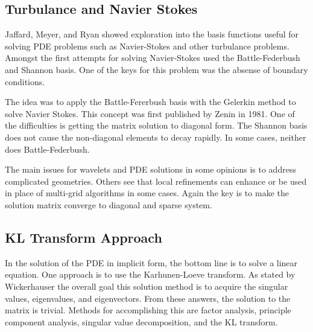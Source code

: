 \documentclass[11pt]{article}
\begin{document}


\subsection {Turbulance and Navier Stokes}
Jaffard, Meyer, and Ryan showed exploration into the basis functions useful for solving PDE problems such as Navier-Stokes and other turbulance problems.  Amongst the first attempts for solving Navier-Stokes used the Battle-Federbush and Shannon basis.  One of the keys for this problem was the absense of boundary conditions.  

The idea was to apply the Battle-Fererbush basis with the Gelerkin method to solve Navier Stokes.  This concept was first published by Zenin in 1981.  One of the difficulties is getting the matrix solution to diagonal form.  The Shannon basis does not cause the non-diagonal elements to decay rapidly.  In some cases, neither does Battle-Federbush.  

The main issues for wavelets and PDE solutions in some opinions is to address complicated geometries.  Others see that local refinements can enhance or be used in place of multi-grid algorithms in some cases.   Again the key is to make the solution matrix converge to diagonal and sparse system.  


\subsection {KL Transform Approach}
In the solution of the PDE in implicit form, the bottom line is to solve a linear equation.  One approach is to use the Karhunen-Loeve transform.   As stated by Wickerhauser \cite{victor} the overall goal this solution method is to acquire the singular values, eigenvalues, and eigenvectors.  From these answers, the solution to the matrix is trivial.  Methods for accomplishing this are factor analysis, principle component analysis, singular value decomposition, and the KL transform.  
\end{document}
